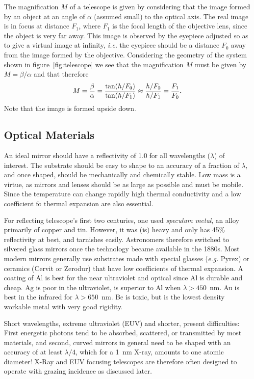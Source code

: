 \documentclass{article}
\begin{document}
The magnification $M$ of a telescope is given by considering that the image
formed by an object at an angle of $\alpha$ (assumed small) to the optical axis.
The real image is in focus at distance $F_1$, where $F_1$ is the focal length of the
objective lens, since the object is very far away. This image is observed by the eyepiece 
adjusted so as to give a virtual image at infinity, {\it i.e.} the eyepiece should be a distance
$F_0$ away from the image formed by the objective. Considering the geometry of the 
system shown in figure~\ref{fig:telescope} we see that the magnification $M$ must 
be given by $M={\beta/\alpha}$ and that therefore
\[ M={\beta\over\alpha}={\tan({h/F_0})\over\tan({h/F_1})}\approx{{h/F_0}\over{h/F_1}}={F_1\over F_0}.\]
Note that the image is formed upside down.

\subsection{Optical Materials}

An ideal mirror should have a reflectivity of 1.0 for all wavelengths ($\lambda$) of interest. The
substrate should be easy to shape to an accuracy of a fraction of $\lambda$, and once shaped, 
should be mechanically and chemically stable. Low mass is a virtue, as mirrors and lenses should
be as large as possible and must be mobile. Since the temperature can change rapidly high 
thermal conductivity and a low coefficient fo thermal expansion are also essential.

For reflecting telescope's first two centuries, one used {\it speculum metal}, an alloy
primarily of copper and tin. However, it was (is) heavy and only has 45\% reflectivity at best, 
and tarnishes easily. Astronomers therefore switched to silvered glass mirrors once the 
technology became available in the 1880s. Most modern mirrors generally use substrates
made with special glasses ({\it e.g.} Pyrex) or ceramics (Cervit or Zerodur) that have low
coefficients of thermal expansion. A coating of Al is best for the near ultraviolet and optical
since Al is durable and cheap. Ag is poor in the ultraviolet, is superior to Al when 
$\lambda>450$~nm. Au is best in the infrared for $\lambda>650$~nm. Be is toxic, but is the
lowest density workable metal with very good rigidity. 

Short wavelengths, extreme ultraviolet (EUV) and shorter, present
difficulties: First energetic photons tend to be absorbed, scattered,
or transmitted by most materials, and second, curved mirrors in general
need to be shaped with an accuracy of at least $\lambda/4$, which for
a 1~nm X-ray, amounts to one atomic diameter! X-Ray and EUV focusing
telescopes are therefore often designed to operate with grazing
incidence as discussed later.
\end{document}

